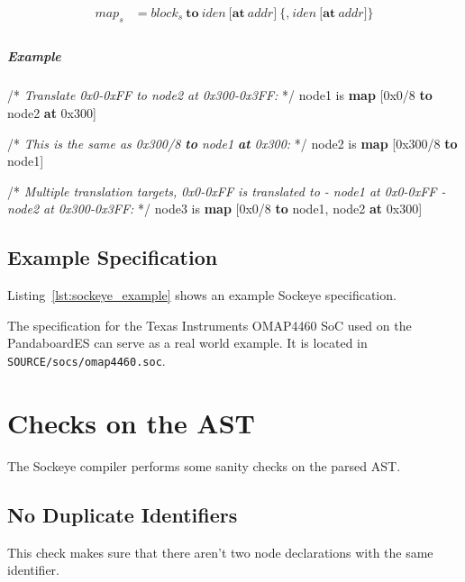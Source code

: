 \documentclass[a4paper,11pt,twoside]{report}
\begin{document}
{{{\begin{align*}
\textit{map}_s & \mathop{=}
\textit{block}_s\ \textbf{to}\ \textit{iden}\ 
	\Big[
		\textbf{at}\ \textit{addr}
	\Big]\
	\Big\{
		\textbf{,}\ \textit{iden}\ 
		\Big[
			\textbf{at}\ \textit{addr}
		\Big]
	\Big\} \\
\end{align*}

\paragraph{Example}
\begin{syntax}
	/* \textit{Translate \textup{0x0-0xFF} to \textup{node2} at \textup{0x300-0x3FF}:} */
	node1 is \textbf{map} [0x0/8 \textbf{to} node2 \textbf{at} 0x300] 

	/* \textit{This is the same as \textup{0x300/8 \textbf{to} node1 \textbf{at} 0x300}:} */
	node2 is \textbf{map} [0x300/8 \textbf{to} node1]

	/* \textit{Multiple translation targets, \textup{0x0-0xFF} is translated to
	   - \textup{node1} at \textup{0x0-0xFF}
	   - \textup{node2} at \textup{0x300-0x3FF}:} */
	node3 is \textbf{map} [0x0/8 \textbf{to} node1, node2 \textbf{at} 0x300]
\end{syntax}

\section{Example Specification}
Listing~\ref{lst:sockeye_example} shows an example Sockeye specification.



The specification for the Texas Instruments OMAP4460 SoC used on the PandaboardES can serve as a real world example. It is located in \texttt{SOURCE/socs/omap4460.soc}.


\chapter{Checks on the AST}
\label{chap:checks}
The Sockeye compiler performs some sanity checks on the parsed AST.

\section{No Duplicate Identifiers}
This check makes sure that there aren't two node declarations with the same identifier.

}}}
\end{document}
